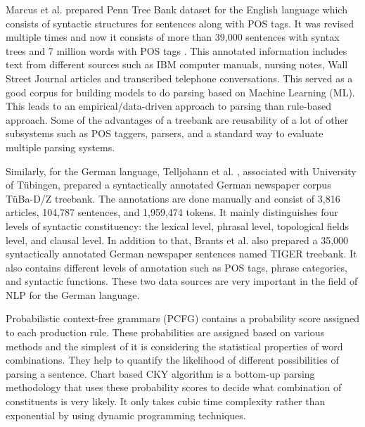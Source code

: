 \documentclass[a4paper, 11pt]{article}
\begin{document}

Marcus et al.\parencite{Marcus1993} prepared Penn Tree Bank dataset for the English language which consists of syntactic structures for sentences along with POS tags. It was revised multiple times and now it consists of more than 39,000 sentences with syntax trees and 7 million words with POS tags \parencite{Taylor2003}. This annotated information includes text from different sources such as IBM computer manuals, nursing notes, Wall Street Journal articles and transcribed telephone conversations. This served as a good corpus for building models to do parsing based on Machine Learning (ML). This leads to an empirical/data-driven approach to parsing than rule-based approach. Some of the advantages of a treebank are reusability of a lot of other subsystems such as POS taggers, parsers, and a standard way to evaluate multiple parsing systems. 

Similarly, for the German language, Telljohann et al. \parencite{TubingenTreebank}, \parencite{Telljohann04thetuba} associated with University of Tübingen, prepared a syntactically annotated German newspaper corpus TüBa-D/Z treebank. The annotations are done manually and consist of 3,816 articles, 104,787 sentences, and 1,959,474 tokens. It mainly distinguishes four levels of syntactic constituency: the lexical level, phrasal level, topological fields level, and clausal level. In addition to that, Brants et al. \parencite{Brants2002TheTT} also prepared a 35,000 syntactically annotated German newspaper sentences named TIGER treebank. It also contains different levels of annotation such as POS tags, phrase categories, and syntactic functions. These two data sources are very important in the field of NLP for the German language. 


Probabilistic context-free grammars (PCFG) \parencite{4569603} contains a probability score assigned to each production rule. These probabilities are assigned based on various methods and the simplest of it is considering the statistical properties of word combinations. They help to quantify the likelihood of different possibilities of parsing a sentence. Chart based CKY \parencite{YOUNGER1967189} algorithm is a bottom-up parsing methodology that uses these probability scores to decide what combination of constituents is very likely. It only takes cubic time complexity rather than exponential by using dynamic programming techniques. 
\end{document}

